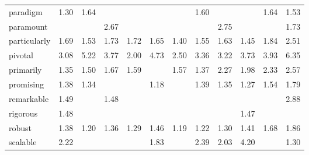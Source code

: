 \begin{tabular}{|l|c|c|c|c|c|c|c|c|c|c|c|}
paradigm & \cellcolor{yellow!26} 1.30 & \cellcolor{yellow!32} 1.64 &  &  &  &  & \cellcolor{yellow!32} 1.60 &  &  & \cellcolor{yellow!32} 1.64 & \cellcolor{yellow!30} 1.53 \\
paramount &  &  & \cellcolor{yellow!53} 2.67 &  &  &  &  & \cellcolor{yellow!55} 2.75 &  &  & \cellcolor{yellow!34} 1.73 \\
particularly & \cellcolor{yellow!33} 1.69 & \cellcolor{yellow!30} 1.53 & \cellcolor{yellow!34} 1.73 & \cellcolor{yellow!34} 1.72 & \cellcolor{yellow!32} 1.65 & \cellcolor{yellow!27} 1.40 & \cellcolor{yellow!31} 1.55 & \cellcolor{yellow!32} 1.63 & \cellcolor{yellow!28} 1.45 & \cellcolor{yellow!36} 1.84 & \cellcolor{yellow!50} 2.51 \\
pivotal & \cellcolor{yellow!61} 3.08 & \cellcolor{yellow!100} 5.22 & \cellcolor{yellow!75} 3.77 & \cellcolor{yellow!40} 2.00 & \cellcolor{yellow!94} 4.73 & \cellcolor{yellow!50} 2.50 & \cellcolor{yellow!67} 3.36 & \cellcolor{yellow!64} 3.22 & \cellcolor{yellow!74} 3.73 & \cellcolor{yellow!78} 3.93 & \cellcolor{yellow!100} 6.35 \\
primarily & \cellcolor{yellow!27} 1.35 & \cellcolor{yellow!30} 1.50 & \cellcolor{yellow!33} 1.67 & \cellcolor{yellow!31} 1.59 &  & \cellcolor{yellow!31} 1.57 & \cellcolor{yellow!27} 1.37 & \cellcolor{yellow!45} 2.27 & \cellcolor{yellow!39} 1.98 & \cellcolor{yellow!46} 2.33 & \cellcolor{yellow!51} 2.57 \\
promising & \cellcolor{yellow!27} 1.38 & \cellcolor{yellow!26} 1.34 &  &  & \cellcolor{yellow!23} 1.18 &  & \cellcolor{yellow!27} 1.39 & \cellcolor{yellow!27} 1.35 & \cellcolor{yellow!25} 1.27 & \cellcolor{yellow!30} 1.54 & \cellcolor{yellow!35} 1.79 \\
remarkable & \cellcolor{yellow!29} 1.49 &  & \cellcolor{yellow!29} 1.48 &  &  &  &  &  &  &  & \cellcolor{yellow!57} 2.88 \\
rigorous & \cellcolor{yellow!29} 1.48 &  &  &  &  &  &  &  & \cellcolor{yellow!29} 1.47 &  &  \\
robust & \cellcolor{yellow!27} 1.38 & \cellcolor{yellow!24} 1.20 & \cellcolor{yellow!27} 1.36 & \cellcolor{yellow!25} 1.29 & \cellcolor{yellow!29} 1.46 & \cellcolor{yellow!23} 1.19 & \cellcolor{yellow!24} 1.22 & \cellcolor{yellow!26} 1.30 & \cellcolor{yellow!28} 1.41 & \cellcolor{yellow!33} 1.68 & \cellcolor{yellow!37} 1.86 \\
scalable & \cellcolor{yellow!44} 2.22 &  &  &  & \cellcolor{yellow!36} 1.83 &  & \cellcolor{yellow!47} 2.39 & \cellcolor{yellow!40} 2.03 & \cellcolor{yellow!84} 4.20 &  & \cellcolor{yellow!26} 1.30 \\

\end{tabular}
